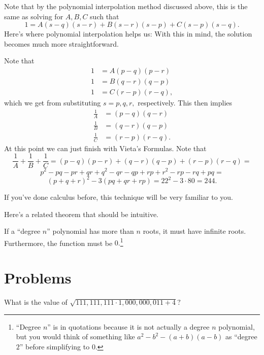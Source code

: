 \documentclass[mast]{lucky}
\begin{document}
\begin{sol}
Note that by the polynomial interpolation method discussed above, this is the same as solving for $A,B,C$ such that
\[1=A(s-q)(s-r)+B(s-r)(s-p)+C(s-p)(s-q).\]
Here's where polynomial interpolation helps us:  With this in mind, the solution becomes much more straightforward.

Note that
\begin{align*}
1&=A(p-q)(p-r) \\
1&=B(q-r)(q-p) \\
1&=C(r-p)(r-q),
\end{align*}
which we get from substituting $s=p,q,r,$ respectively. This then implies
\begin{align*}
\frac{1}{A}&=(p-q)(q-r) \\
\frac{1}{B}&=(q-r)(q-p) \\
\frac{1}{C}&=(r-p)(r-q).
\end{align*}
At this point we can just finish with Vieta's Formulas. Note that
\[\frac{1}{A}+\frac{1}{B}+\frac{1}{C}=(p-q)(p-r)+(q-r)(q-p)+(r-p)(r-q)=\]
\[p^2-pq-pr+qr+q^2-qr-qp+rp+r^2-rp-rq+pq=\]
\[(p+q+r)^2-3(pq+qr+rp)=22^2-3\cdot 80=244.\]
\end{sol}

If you've done calculus before, this technique will be very familiar to you.

Here's a related theorem that should be intuitive.

\begin{fact}
If a ``degree $n$'' polynomial has more than $n$ roots, it must have infinite roots. Furthermore, the function must be $0.$\footnote{``Degree $n$'' is in quotations because it is not actually a degree $n$ polynomial, but you would think of something like $a^2-b^2-(a+b)(a-b)$ as ``degree $2$'' before simplifying to $0.$}
\end{fact}

\pagebreak

\section{Problems}



\begin{prob}[MATHCOUNTS 2020]{1}
What is the value of $\sqrt{111,111,111\cdot 1,000,000,011+4}?$
\end{prob}
\end{document}
